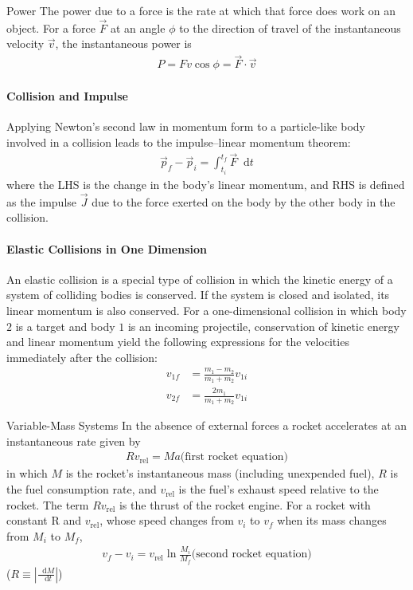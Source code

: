 \documentclass{article}
\newcommand*\diff{\mathop{}\!\mathrm{d}}
\numberwithin{equation}{subsection} %
\theoremstyle{definition}
\begin{document}
Power The power due to a force is the rate at which that force
does work on an object. For a force $\vec F$ at an angle $\phi$ to the
direction of travel of the instantaneous velocity $\vec v$, the
instantaneous power is
\begin{align}
    P = Fv \cos{\phi} = \vec{F} \cdot \vec{v}
\end{align}

\paragraph{Collision and Impulse} Applying Newton’s second law in
momentum form to a particle-like body involved in a collision
leads to the impulse–linear momentum theorem:
\begin{align}
    \vec{p}_f - \vec{p}_i = \int_{t_i}^{t_f} \vec{F} \diff t
\end{align}
where the LHS is the change in the body’s linear
momentum, and RHS is defined as the impulse $\vec{J}$ due to the force
exerted on the body by the other body in the collision.

\paragraph{Elastic Collisions in One Dimension} An elastic collision
is a special type of collision in which the kinetic energy of a system
of colliding bodies is conserved. If the system is closed and
isolated, its linear momentum is also conserved. For a one-dimensional
collision in which body $2$ is a target and body $1$ is an incoming
projectile, conservation of kinetic energy and linear momentum yield
the following expressions for the velocities immediately after the
collision:
\begin{align}
    v_{1f} &= \frac{m_1-m_2}{m_1+m_2} v_{1i} \\
    v_{2f} &= \frac{2m_1}{m_1+m_2} v_{1i}
\end{align}

Variable-Mass Systems In the absence of external forces a rocket
accelerates at an instantaneous rate given by
\begin{align}
    R v_{\text{rel}} = Ma \text{(first rocket equation)}
\end{align}
in which $M$ is the rocket’s instantaneous mass (including
unexpended fuel), $R$ is the fuel consumption rate, and $v_{\text{rel}}$ is the fuel’s
exhaust speed relative to the rocket. The term $R v_{\text{rel}}$ is the thrust of
the rocket engine. For a rocket with constant R and $v_{\text{rel}}$, whose speed
changes from $v_i$ to $v_f$ when its mass changes from $M_i$ to $M_f$,
\begin{align}
    v_f - v_i = v_{\text{rel}} \ln\frac{M_i}{M_f} \text{(second rocket
    equation)}
\end{align}
($R\equiv |\frac{\diff M}{\diff t}|$)
\end{document}
